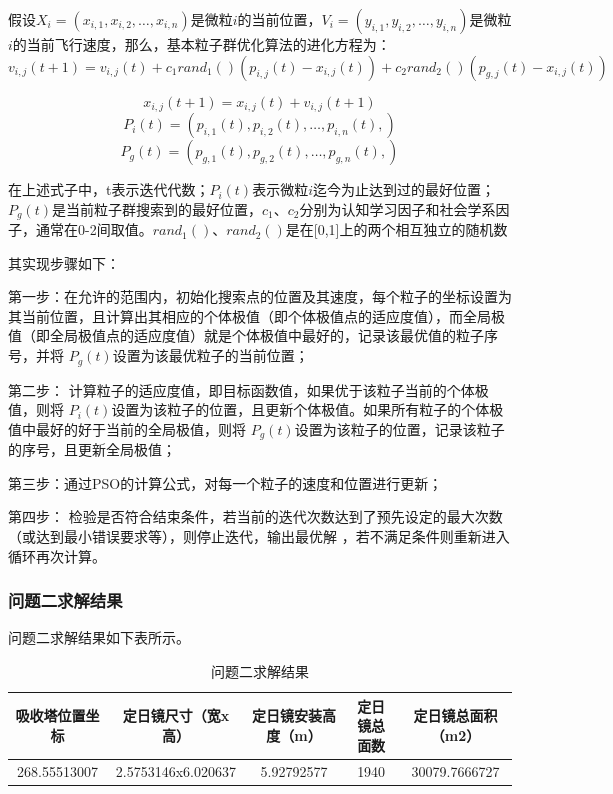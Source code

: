 \documentclass[withoutpreface,bwprint]{cumcmthesis} %
\begin{document}
假设$X_{i}=(x_{i,1},x_{i,2},\ldots,x_{i,n})$是微粒$i$的当前位置，$V_{i}=(y_{i,1},y_{i,2},\ldots,y_{i,n})$是微粒$i$的当前飞行速度，那么，基本粒子群优化算法的进化方程为：$$v_{i,j}(t+1)=v_{i,j}(t)+c_{1}rand_{1}()(p_{i,j}(t)-x_{i,j}(t))+c_{2}rand_{2}()(p_{g,j}(t)-x_{i,j}(t))$$

$$x_{i,j}(t+1)=x_{i,j}(t)+v_{i,j}(t+1)$$
$$P_{i}(t)=(p_{i,1}(t),p_{i,2}(t),\ldots,p_{i,n}(t),)$$
$$P_{g}(t)=(p_{g,1}(t),p_{g,2}(t),\ldots,p_{g,n}(t),)$$

在上述式子中，t表示迭代代数；$P_{i}(t)$表示微粒$i$迄今为止达到过的最好位置；$P_{g}(t)$是当前粒子群搜索到的最好位置，$c_{1}$、$c_{2}$分别为认知学习因子和社会学系因子，通常在0-2间取值。$rand_1()$、$rand_2()$是在[0,1]上的两个相互独立的随机数

其实现步骤如下：

第一步：在允许的范围内，初始化搜索点的位置及其速度，每个粒子的坐标设置为其当前位置，且计算出其相应的个体极值（即个体极值点的适应度值），而全局极值（即全局极值点的适应度值）就是个体极值中最好的，记录该最优值的粒子序号，并将 $P_{g}(t)$设置为该最优粒子的当前位置；

第二步： 计算粒子的适应度值，即目标函数值，如果优于该粒子当前的个体极值，则将 $P_{i}(t)$设置为该粒子的位置，且更新个体极值。如果所有粒子的个体极值中最好的好于当前的全局极值，则将 $P_{g}(t)$设置为该粒子的位置，记录该粒子的序号，且更新全局极值；

第三步：通过PSO的计算公式，对每一个粒子的速度和位置进行更新；

第四步： 检验是否符合结束条件，若当前的迭代次数达到了预先设定的最大次数（或达到最小错误要求等），则停止迭代，输出最优解  ，若不满足条件则重新进入循环再次计算。

\subsubsection{问题二求解结果}

问题二求解结果如下表所示。

\begin{table}[]
    \centering
    \caption{问题二求解结果}
    \begin{tabular}{@{}ccccc@{}}
        \toprule
        吸收塔位置坐标      & 定日镜尺寸（宽x高）         & 定日镜安装高度（m） & 定日镜总面数 & 定日镜总面积（m2）    \\ \midrule
        268.55513007 & 2.5753146x6.020637 & 5.92792577 & 1940   & 30079.7666727 \\ \bottomrule
    \end{tabular}
\end{table}
\end{document}
